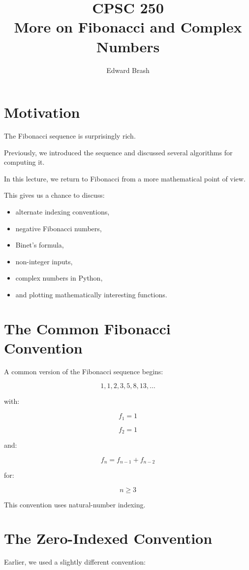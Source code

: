 \documentclass[11pt]{article}
\title{CPSC 250 \\ More on Fibonacci and Complex Numbers}
\author{Edward Brash}
\date{}
\begin{document}
\maketitle

\section{Motivation}

The Fibonacci sequence is surprisingly rich.

Previously, we introduced the sequence and discussed several algorithms for computing it.

In this lecture, we return to Fibonacci from a more mathematical point of view.

This gives us a chance to discuss:

\begin{itemize}
    \item alternate indexing conventions,
    \item negative Fibonacci numbers,
    \item Binet's formula,
    \item non-integer inputs,
    \item complex numbers in Python,
    \item and plotting mathematically interesting functions.
\end{itemize}

\section{The Common Fibonacci Convention}

A common version of the Fibonacci sequence begins:

\[
1, 1, 2, 3, 5, 8, 13, \ldots
\]

with:

\[
f_1 = 1
\]

\[
f_2 = 1
\]

and:

\[
f_n = f_{n-1} + f_{n-2}
\]

for:

\[
n \ge 3
\]

This convention uses natural-number indexing.

\section{The Zero-Indexed Convention}

Earlier, we used a slightly different convention:
\end{document}

